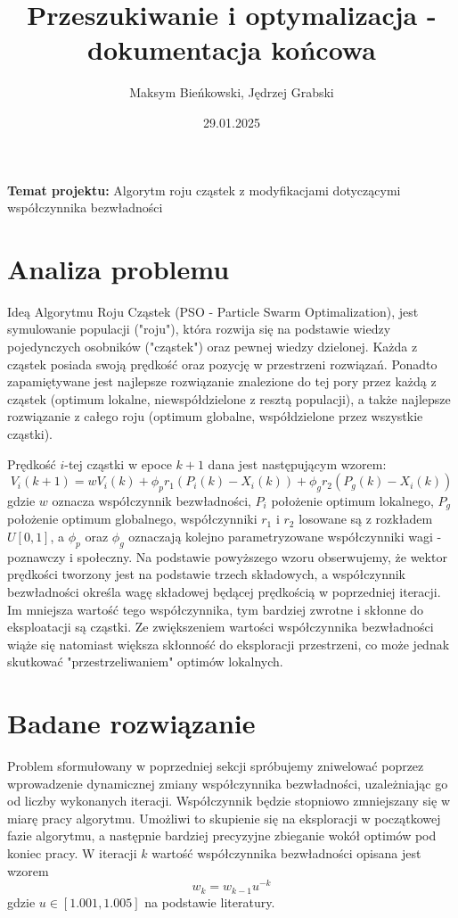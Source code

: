 \documentclass[12pt]{article}
\title{Przeszukiwanie i optymalizacja - dokumentacja końcowa}
\author{Maksym Bieńkowski, Jędrzej Grabski}
\date{29.01.2025}
\begin{document}
\maketitle
\begin{centering}
	\textbf{Temat projektu: }Algorytm roju cząstek z modyfikacjami dotyczącymi współczynnika bezwładności
\end{centering}

\section{Analiza problemu}

Ideą Algorytmu Roju Cząstek (PSO - Particle Swarm Optimalization), jest symulowanie populacji ("roju"),
która rozwija się na podstawie wiedzy pojedynczych osobników ("cząstek") oraz pewnej wiedzy dzielonej.
Każda z cząstek posiada swoją prędkość oraz pozycję w przestrzeni rozwiązań.
Ponadto zapamiętywane jest najlepsze rozwiązanie znalezione do tej pory przez każdą z cząstek (optimum lokalne, niewspółdzielone
z resztą populacji), a także najlepsze rozwiązanie z całego roju (optimum globalne, współdzielone przez wszystkie cząstki).

Prędkość \(i\)-tej cząstki w epoce \(k+1\) dana jest następującym wzorem:\[V_i(k+1) = wV_i(k) + \phi_p r_1(P_i(k) - X_i(k)) + \phi_g r_2(P_g(k) - X_i(k))\]
gdzie \(w\) oznacza współczynnik bezwładności, \(P_i\) położenie optimum lokalnego, \(P_g\) położenie optimum globalnego, współczynniki \(r_1\) i \(r_2\)
losowane są z rozkładem \(U[0, 1]\), a \(\phi_p\) oraz \(\phi_g\) oznaczają kolejno parametryzowane współczynniki wagi - poznawczy i społeczny. Na podstawie powyższego wzoru obserwujemy,
że wektor prędkości tworzony jest na podstawie trzech składowych, a współczynnik bezwładności określa wagę składowej będącej
prędkością w poprzedniej iteracji. Im mniejsza wartość tego współczynnika, tym bardziej zwrotne i skłonne do eksploatacji są cząstki.
Ze zwiększeniem wartości współczynnika bezwładności wiąże się natomiast większa skłonność do eksploracji przestrzeni, co może jednak skutkować "przestrzeliwaniem"\space
optimów lokalnych.



\section{Badane rozwiązanie}

Problem sformułowany w poprzedniej sekcji spróbujemy zniwelować poprzez wprowadzenie dynamicznej zmiany współczynnika bezwładności,
uzależniając go od liczby wykonanych iteracji. Współczynnik będzie stopniowo zmniejszany się w miarę pracy algorytmu.
Umożliwi to skupienie się na eksploracji w początkowej fazie algorytmu, a następnie bardziej precyzyjne
zbieganie wokół optimów pod koniec pracy. W iteracji \(k\) wartość współczynnika bezwładności opisana jest wzorem
\[w_{k} = w_{k-1}u^{-k}\]
gdzie  \(u \in [1.001, 1.005]\) na podstawie literatury.
\end{document}
